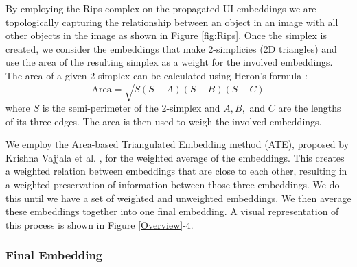 By employing the Rips complex on the propagated UI embeddings we are topologically capturing the relationship between an object in an image with all other objects in the image as shown in Figure \ref{fig:Rips}. Once the simplex is created, we consider the embeddings that make $2$-simplicies (2D triangles) and use the area of the resulting simplex as a weight for the involved embeddings. The area of a given 2-simplex can be calculated using Heron's formula \cite{weisstein2003heron}:
\begin{equation}
    \text{Area} = \sqrt{S(S-A)(S-B)(S-C)}
\end{equation}
\noindent where $S$ is the semi-perimeter of the 2-simplex and $A,B,$ and $C$ are the lengths of its three edges. The area is then used to weigh the involved embeddings.

We employ the Area-based Triangulated Embedding method (ATE), proposed by Krishna Vajjala et al. \cite{vajjala2024vietoris}, for the weighted average of the embeddings. This creates a weighted relation between embeddings that are close to each other, resulting in a weighted preservation of information between those three embeddings. We do this until we have a set of weighted and unweighted embeddings. We then average these embeddings together into one final embedding. A visual representation of this process is shown in Figure \ref{Overview}-4. 

\subsubsection{Final Embedding}

